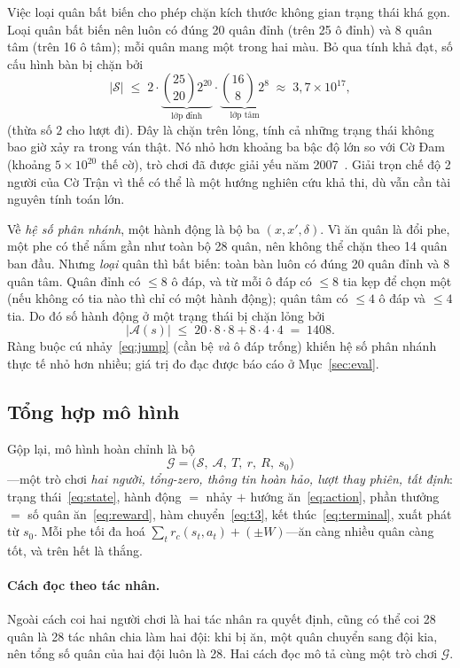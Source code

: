 Việc loại quân bất biến cho phép chặn kích thước không gian trạng
thái khá gọn. Loại quân bất biến nên luôn có đúng 20 quân đỉnh
(trên 25 ô đỉnh) và 8 quân tâm (trên 16 ô tâm); mỗi quân mang một trong
hai màu. Bỏ qua tính khả đạt, số cấu hình bàn bị chặn bởi
\begin{equation}
|\mathcal S| \;\le\; 2\cdot
\underbrace{\binom{25}{20}2^{20}}_{\text{lớp đỉnh}}\cdot
\underbrace{\binom{16}{8}\,2^{8}}_{\text{lớp tâm}}
\;\approx\; 3{,}7\times10^{17},
\label{eq:statespace}
\end{equation}
(thừa số $2$ cho lượt đi). Đây là chặn trên lỏng, tính cả những trạng thái
không bao giờ xảy ra trong ván thật. Nó nhỏ hơn khoảng ba bậc độ lớn so với
Cờ Đam (khoảng $5\times10^{20}$ thế cờ), trò chơi đã được giải yếu năm
2007~\citep{schaeffer2007checkers}. Giải trọn chế độ 2 người của Cờ Trận vì
thế có thể là một hướng nghiên cứu khả thi, dù vẫn cần tài nguyên tính toán
lớn.

Về \emph{hệ số phân nhánh}, một hành động là bộ ba $(x,x',\delta)$. Vì ăn
quân là đổi phe, một phe có thể nắm gần như toàn bộ 28 quân, nên không thể
chặn theo 14 quân ban đầu. Nhưng \emph{loại} quân thì bất biến: toàn bàn
luôn có đúng 20 quân đỉnh và 8 quân tâm. Quân đỉnh có $\le 8$ ô đáp, và từ
mỗi ô đáp có $\le 8$ tia kẹp để chọn một (nếu không có tia nào thì chỉ có
một hành động); quân tâm có $\le 4$ ô đáp và $\le 4$ tia. Do đó số hành
động ở một trạng thái bị chặn lỏng bởi
\begin{equation}
|\mathcal A(s)| \;\le\; 20\cdot 8\cdot 8 + 8\cdot 4\cdot 4 \;=\; 1408 .
\label{eq:branchbound}
\end{equation}
Ràng buộc cú nhảy~\eqref{eq:jump} (cần bệ \emph{và} ô đáp trống) khiến
hệ số phân nhánh thực tế nhỏ hơn nhiều; giá trị đo đạc được báo cáo ở
Mục~\ref{sec:eval}.

\subsection{Tổng hợp mô hình}
\label{ssec:onelinerule}

Gộp lại, mô hình hoàn chỉnh là bộ
\begin{equation}
\boxed{\;\mathcal G=\big(\mathcal S,\ \mathcal A,\ T,\ r,\ R,\ s_0\big)\;}
\label{eq:game}
\end{equation}
---một trò chơi \emph{hai người, tổng-zero, thông tin hoàn hảo, lượt thay
phiên, tất định}: trạng thái~\eqref{eq:state}, hành động $=$ nhảy $+$
hướng ăn~\eqref{eq:action}, phần thưởng $=$ số quân ăn~\eqref{eq:reward},
hàm chuyển~\eqref{eq:t3}, kết thúc~\eqref{eq:terminal}, xuất phát từ $s_0$.
Mỗi phe tối đa hoá $\sum_t r_c(s_t,a_t)+(\pm W)$---ăn càng nhiều quân càng
tốt, và trên hết là thắng.

\paragraph{Cách đọc theo tác nhân.} Ngoài cách coi hai người chơi là hai
tác nhân ra quyết định, cũng có thể coi 28 quân là 28 tác nhân chia làm hai
đội: khi bị ăn, một quân chuyển sang đội kia, nên tổng số quân của hai đội
luôn là 28. Hai cách đọc mô tả cùng một trò chơi $\mathcal G$.
